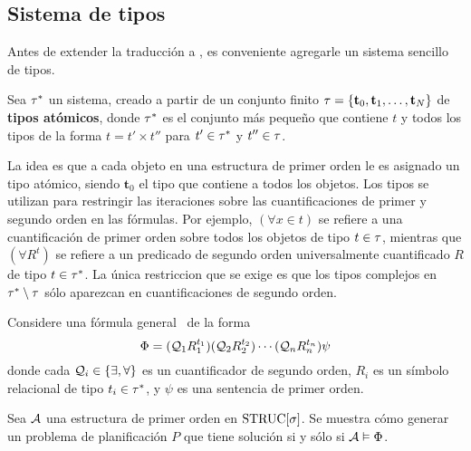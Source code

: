 \subsection{Sistema de tipos}
Antes de extender la traducción a \PH, es conveniente agregarle un sistema
sencillo de tipos.

Sea $\tau^*$ un sistema, creado a partir de un conjunto finito 
$\tau=\{\mathbf{t}_0,\mathbf{t}_1,\ldots,\mathbf{t}_N\}$
de \textbf{tipos atómicos}, donde $\tau^*$ es el conjunto más pequeño que
contiene $t$ y todos los tipos de la forma $t=t'\times t''$
para $t'\in\tau^*$ y $t''\in\tau$.

La idea es que a cada objeto en una estructura de primer orden le es asignado
un tipo atómico, siendo $\mathbf{t}_0$ el tipo que contiene a todos los
objetos.
Los tipos se utilizan para restringir las iteraciones sobre las
cuantificaciones de primer y segundo orden en las fórmulas.
Por ejemplo, $(\forall x\in t)$ se refiere a una cuantificación de primer orden
sobre todos los objetos de tipo $t\in\tau$, mientras que
$(\forall R^t)$ se refiere a un predicado de segundo orden universalmente
cuantificado $R$ de tipo $t\in\tau^*$.
La única restriccion que se exige es que los tipos complejos en 
$\tau^*\setminus\tau$ sólo aparezcan en cuantificaciones de segundo orden.

Considere una fórmula general \LSO\ de la forma
\begin{equation}
\Phi = (\mathcal{Q}_1R_1^{t_1})(\mathcal{Q}_2R_2^{t_2})\cdots(\mathcal{Q}_nR_n^{t_n})\psi
\end{equation}
donde cada $\mathcal{Q}_i\in\{\exists,\forall\}$ es un cuantificador de segundo orden,
$R_i$ es un símbolo relacional de tipo $t_i\in\tau^*$,
y $\psi$ es una sentencia de primer orden.

Sea $\mathcal{A}$ una estructura de primer orden en $\text{STRUC}[\sigma]$.
Se muestra cómo generar un problema de planificación $P$ que tiene solución si
y sólo si $\mathcal{A}\vDash\Phi$.

